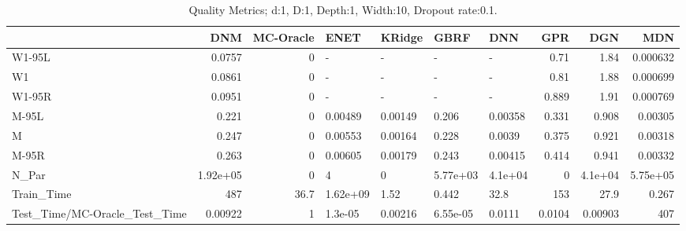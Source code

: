 \begin{table}
\centering
\caption{Quality Metrics; d:1, D:1, Depth:1, Width:10, Dropout rate:0.1.}
\begin{tabular}{lrrllllrrr}
\toprule
{} &      DNM &  MC-Oracle &     ENET &  KRidge &     GBRF &     DNN &    GPR &     DGN &      MDN \\
\midrule
W1-95L                        &   0.0757 &          0 &        - &       - &        - &       - &   0.71 &    1.84 & 0.000632 \\
W1                            &   0.0861 &          0 &        - &       - &        - &       - &   0.81 &    1.88 & 0.000699 \\
W1-95R                        &   0.0951 &          0 &        - &       - &        - &       - &  0.889 &    1.91 & 0.000769 \\
M-95L                         &    0.221 &          0 &  0.00489 & 0.00149 &    0.206 & 0.00358 &  0.331 &   0.908 &  0.00305 \\
M                             &    0.247 &          0 &  0.00553 & 0.00164 &    0.228 &  0.0039 &  0.375 &   0.921 &  0.00318 \\
M-95R                         &    0.263 &          0 &  0.00605 & 0.00179 &    0.243 & 0.00415 &  0.414 &   0.941 &  0.00332 \\
N\_Par                         & 1.92e+05 &          0 &        4 &       0 & 5.77e+03 & 4.1e+04 &      0 & 4.1e+04 & 5.75e+05 \\
Train\_Time                    &      487 &       36.7 & 1.62e+09 &    1.52 &    0.442 &    32.8 &    153 &    27.9 &    0.267 \\
Test\_Time/MC-Oracle\_Test\_Time &  0.00922 &          1 &  1.3e-05 & 0.00216 & 6.55e-05 &  0.0111 & 0.0104 & 0.00903 &      407 \\
\bottomrule
\end{tabular}
\end{table}
